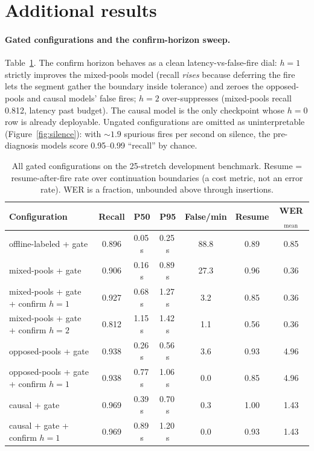 \documentclass[11pt]{article}
\begin{document}
\section{Additional results}
\label{app:tables}

\paragraph{Gated configurations and the confirm-horizon sweep.} Table~\ref{tab:appconfirm}. The confirm horizon behaves as a clean latency-vs-false-fire dial: $h{=}1$ strictly improves the mixed-pools model (recall \emph{rises} because deferring the fire lets the segment gather the boundary inside tolerance) and zeroes the opposed-pools and causal models' false fires; $h{=}2$ over-suppresses (mixed-pools recall 0.812, latency past budget). The causal model is the only checkpoint whose $h{=}0$ row is already deployable. Ungated configurations are omitted as uninterpretable (Figure~\ref{fig:silence}): with ${\sim}1.9$ spurious fires per second on silence, the pre-diagnosis models score 0.95--0.99 ``recall'' by chance.

\begin{table}[h]
  \centering\small
  \caption{All gated configurations on the 25-stretch development benchmark. Resume = resume-after-fire rate over continuation boundaries (a cost metric, not an error rate). WER is a fraction, unbounded above through insertions.}
  \label{tab:appconfirm}
  \begin{tabular}{lcccccc}
    \toprule
    Configuration & Recall & P50 & P95 & False/min & Resume & WER$_\text{mean}$ \\
    \midrule
    offline-labeled + gate & 0.896 & 0.05\,s & 0.25\,s & 88.8 & 0.89 & 0.85 \\
    mixed-pools + gate & 0.906 & 0.16\,s & 0.89\,s & 27.3 & 0.96 & 0.36 \\
    mixed-pools + gate + confirm $h{=}1$ & 0.927 & 0.68\,s & 1.27\,s & 3.2 & 0.85 & 0.36 \\
    mixed-pools + gate + confirm $h{=}2$ & 0.812 & 1.15\,s & 1.42\,s & 1.1 & 0.56 & 0.36 \\
    opposed-pools + gate & 0.938 & 0.26\,s & 0.56\,s & 3.6 & 0.93 & 4.96 \\
    opposed-pools + gate + confirm $h{=}1$ & 0.938 & 0.77\,s & 1.06\,s & 0.0 & 0.85 & 4.96 \\
    causal + gate & 0.969 & 0.39\,s & 0.70\,s & 0.3 & 1.00 & 1.43 \\
    causal + gate + confirm $h{=}1$ & 0.969 & 0.89\,s & 1.20\,s & 0.0 & 0.93 & 1.43 \\
    \bottomrule
  \end{tabular}
\end{table}
\end{document}
